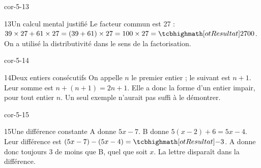 \begin{blocLivre}{cor-5-13}\begin{corrige}{13}{Un calcul mental justifié}
Le facteur commun est 27 : $39\times27+61\times27=(39+61)\times27=100\times27=\res{2700}$. On a utilisé la distributivité dans le sens de la factorisation.
\end{corrige}\end{blocLivre}
\begin{blocLivre}{cor-5-14}\begin{corrige}{14}{Deux entiers consécutifs}
On appelle $n$ le premier entier ; le suivant est $n+1$. Leur somme est $n+(n+1)=2n+1$. Elle a donc la forme d’un entier impair, pour tout entier $n$. Un seul exemple n’aurait pas suffi à le démontrer.
\end{corrige}\end{blocLivre}
\begin{blocLivre}{cor-5-15}\begin{corrige}{15}{Une différence constante}
A donne $5x-7$. B donne $5(x-2)+6=5x-4$. Leur différence est $(5x-7)-(5x-4)=\res{-3}$. A donne donc toujours 3 de moins que B, quel que soit $x$. La lettre disparaît dans la différence.
\end{corrige}\end{blocLivre}

